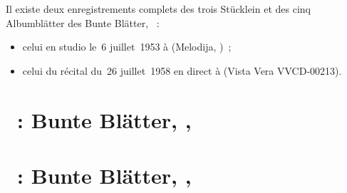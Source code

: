Il existe deux enregistrements complets des trois Stücklein et des cinq
Albumblätter des Bunte Blätter,  ~:
\begin{itemize}
 \item
 celui en studio le~6 juillet~1953 à \Moscow (Melodija, )~;
 \item
 celui du récital du~26 juillet~1958 en direct à \MSHM (Vista Vera
 VVCD-00213).
\end{itemize}

\section{\ifChrono \Schumann{}~: \fi
Bunte Blätter,  , }
\label{\thesection}

\begin{workitemize}
 \item{}
 \begin{perfitemize}
  \item{}
  \item{}
 \end{perfitemize}
 \item{}
 \begin{perfitemize}
  \item{}
  \item{}
 \end{perfitemize}
 \item{}
 \begin{perfitemize}
  \item{}
 \end{perfitemize}
\end{workitemize}

\section{\ifChrono \Schumann{}~: \fi
Bunte Blätter,  , }
\label{\thesection}

